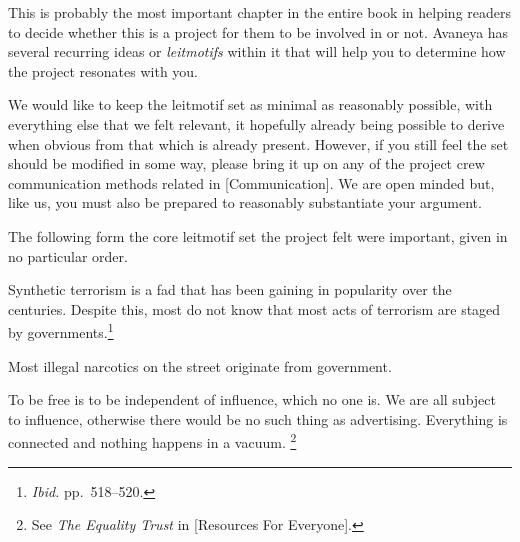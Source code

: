 

This is probably the most important chapter in the entire book in helping readers to decide whether this is a project for them to be involved in or not. Avaneya has several recurring ideas or {\it leitmotifs} within it that will help you to determine how the project resonates with you.

We would like to keep the leitmotif set as minimal as reasonably possible, with everything else that we felt relevant, it hopefully already being possible to derive when obvious from that which is already present. However, if you still feel the set should be modified in some way, please bring it up on any of the project crew communication methods related in [Communication]. We are open minded but, like us, you must also be prepared to reasonably substantiate your argument.

The following form the core leitmotif set the project felt were important, given in no particular order.

\startitemize[4]

Synthetic terrorism is a fad that has been gaining in popularity over the centuries. Despite this, most do not know that most acts of terrorism are staged by governments.\footnotecite[extras={ p.~193.}][shirer1960]\footnote{{\it Ibid.} pp.~518--520.}\footnotecite[harrit2009]\footnotecite[northwoods]\footnotecite[]


Most illegal narcotics on the street originate from government.


To be free is to be independent of influence, which no one is. We are all subject to influence, otherwise there would be no such thing as advertising. Everything is connected and nothing happens in a vacuum. \footnote{See {\it The Equality Trust} in [Resources For Everyone].}

